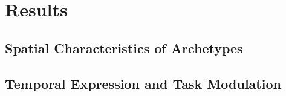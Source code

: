 \documentclass[12pt]{article}
\begin{document}






\section*{Results}

\subsection*{Spatial Characteristics of Archetypes}




\subsection*{Temporal Expression and Task Modulation}



\end{document}
